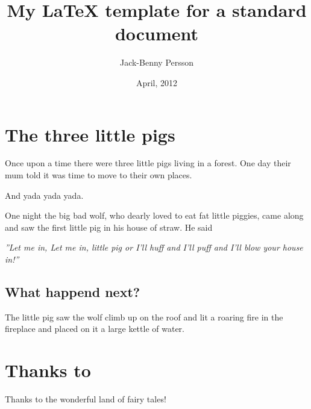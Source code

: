 \documentclass[11pt,a4paper]{article}
\title{My \LaTeX{} template for a standard document}
\author{Jack-Benny Persson}
\date{April, 2012}
\begin{document}
\maketitle
\pagebreak

\tableofcontents

\pagebreak

\section{The three little pigs}

Once upon a time there were three little pigs living in a forest. One day their 
mum told it was time to move to their own places.

And yada yada yada.

One night the big bad wolf, who dearly loved to eat fat little piggies, came 
along and saw the first little pig in his house of straw. He said

\textit{''Let me in, Let me in, little pig or I'll huff and I'll puff and I'll 
blow your house in!''}



\subsection{What happend next?}

The little pig saw the wolf climb up on the roof and lit a roaring fire in the 
fireplace and placed on it a large kettle of water.

\section{Thanks to}

Thanks to the wonderful land of fairy tales!
\end{document}
